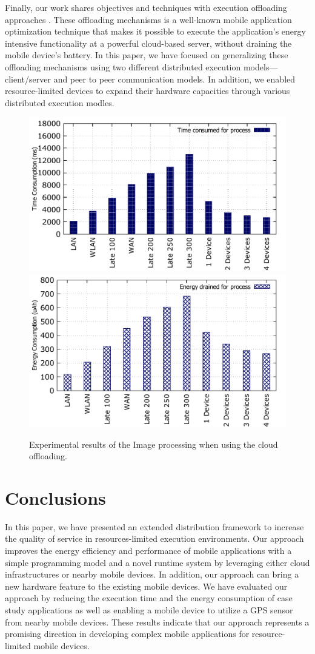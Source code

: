 \documentclass{sig-alternate}
\begin{document}
Finally, our work shares objectives and techniques with execution  offloading approaches \cite{maui,comet,mobile-cloud-middleware,fuzzy-engine,sokol+:thinkair}. These offloading mechanisms is a well-known mobile application optimization technique that makes it possible to execute the application's energy intensive functionality at a powerful cloud-based server, without draining the mobile device's battery. In this paper, we have focused on generalizing these offloading mechanisms using two different distributed execution models---client/server and peer to peer communication models. In addition, we enabled resource-limited devices to expand their hardware capacities through various distributed execution modles.


\begin{figure}
\centering
		\includegraphics[width=.42\textwidth]{data/off_compare_img_perf.pdf}
		\includegraphics[width=.42\textwidth]{data/off_compare_img_energy.pdf}
	\caption{Experimental results of the Image processing when using the cloud offloading.}
	\label{fig:off_compare_img}
\end{figure}


\section{Conclusions}
\label{sec:conc}
%
In this paper, we have presented an extended distribution framework to increase the quality of service in resources-limited execution environments. Our approach improves the energy efficiency and performance of mobile applications with a simple programming model and a novel runtime system by leveraging either cloud infrastructures or nearby mobile devices. In addition, our approach can bring a new hardware feature to the existing mobile devices. We have evaluated our approach by reducing the execution time and the energy consumption of case study applications as well as enabling a mobile device to utilize a GPS sensor from nearby mobile devices. These results indicate that our approach represents a promising direction in developing complex mobile applications for resource-limited mobile devices.


\balance


\end{document}
